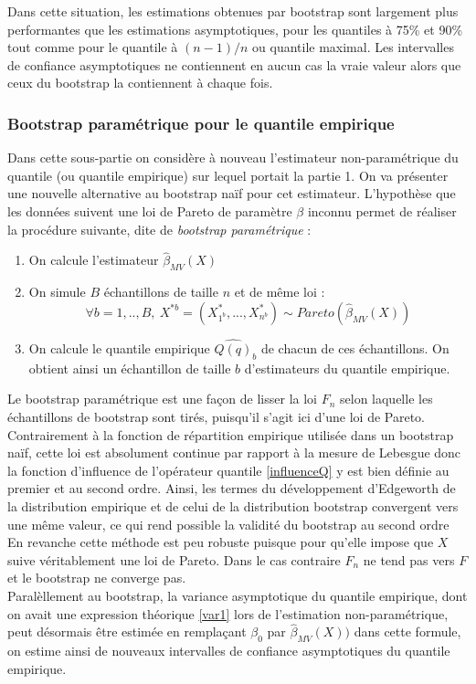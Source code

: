 \documentclass{article}
\renewcommand*{\(}{ \left( }
\renewcommand*{\)}{ \right) }
\begin{document}
Dans cette situation, les estimations obtenues par bootstrap sont largement plus performantes que les estimations asymptotiques, pour les quantiles à 75\% et 90\% tout comme pour le quantile à $(n-1)/n$ ou quantile maximal. Les intervalles de confiance asymptotiques ne contiennent en aucun cas la vraie valeur alors que ceux du bootstrap la contiennent à chaque fois.

\subsubsection{Bootstrap paramétrique pour le quantile empirique}
Dans cette sous-partie on considère à nouveau l'estimateur non-paramétrique du quantile (ou quantile empirique) sur lequel portait la partie 1. On va présenter une nouvelle alternative au bootstrap naïf pour cet estimateur.
L'hypothèse que les données suivent une loi de Pareto de paramètre $\beta$ inconnu permet de réaliser la procédure suivante, dite de \emph{bootstrap paramétrique} :
\begin{enumerate}
\item On calcule l'estimateur $\widehat{\beta}_{MV}(X)$
\item On simule $B$ échantillons de taille $n$ et de même loi : 
\[\forall b = 1,..,B, \ X^{*b} = (X^*_{1^b}, ..., X^*_{n^b}) \sim Pareto(\widehat{\beta}_{MV}(X)) \]
\item On calcule le quantile empirique $\widehat{Q(q)}_b$ de chacun de ces échantillons. On obtient ainsi un échantillon de taille $b$ d'estimateurs du quantile empirique. 
\end{enumerate}
Le bootstrap paramétrique est une façon de lisser la loi $F_n$ selon laquelle les échantillons de bootstrap sont tirés, puisqu'il s'agit ici d'une loi de Pareto. Contrairement à la fonction de répartition empirique utilisée dans un bootstrap naïf, cette loi est absolument continue par rapport à la mesure de Lebesgue donc la fonction d'influence de l'opérateur quantile \eqref{influenceQ} y est bien définie au premier et au second ordre. Ainsi, les termes du développement d'Edgeworth de la distribution empirique et de celui de la distribution bootstrap convergent vers une même valeur, ce qui rend possible la validité du bootstrap au second ordre \\ 

En revanche cette méthode est peu robuste puisque pour qu'elle impose que $X$ suive véritablement une loi de Pareto. Dans le cas contraire $F_n$ ne tend pas vers $F$ et le bootstrap ne converge pas. \\ 
Paralèllement au bootstrap, la variance asymptotique du quantile empirique, dont on avait une expression théorique \eqref{var1} lors de l'estimation non-paramétrique, peut désormais être estimée en remplaçant $\beta_0$ par $\widehat{\beta}_{MV}(X))$ dans cette formule, on estime ainsi de nouveaux intervalles de confiance asymptotiques du quantile empirique.
\end{document}
